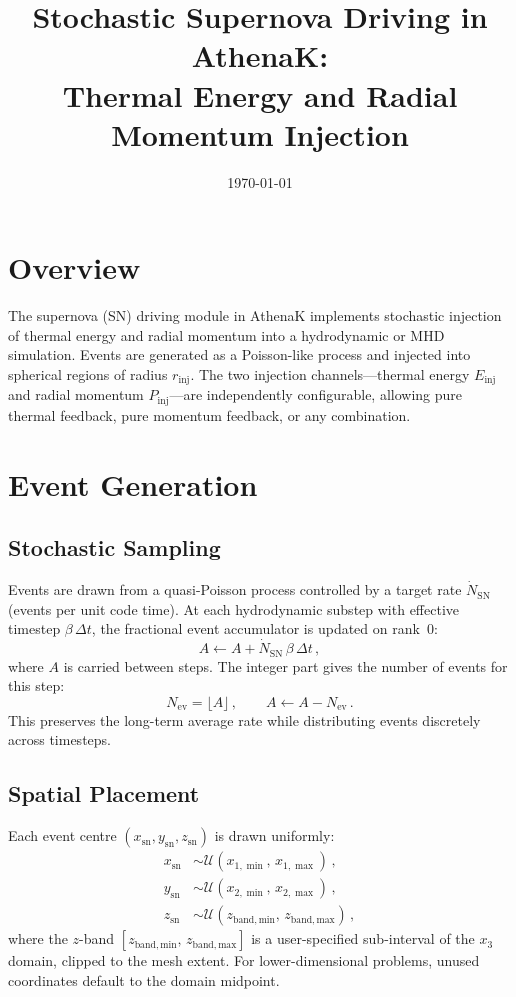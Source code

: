 \documentclass[11pt]{article}
\title{Stochastic Supernova Driving in AthenaK:\\Thermal Energy and Radial Momentum Injection}
\author{}
\date{\today}
\begin{document}
\maketitle

\section{Overview}

The supernova (SN) driving module in AthenaK implements stochastic injection of
thermal energy and radial momentum into a hydrodynamic or MHD simulation.  Events
are generated as a Poisson-like process and injected into spherical regions of
radius $r_\mathrm{inj}$.  The two injection channels---thermal energy
$E_\mathrm{inj}$ and radial momentum $P_\mathrm{inj}$---are independently
configurable, allowing pure thermal feedback, pure momentum feedback, or any
combination.

\section{Event Generation}

\subsection{Stochastic Sampling}

Events are drawn from a quasi-Poisson process controlled by a target rate
$\dot{N}_\mathrm{SN}$ (events per unit code time).  At each hydrodynamic
substep with effective timestep $\beta\,\Delta t$, the fractional event
accumulator is updated on rank~0:
\begin{equation}
  A \leftarrow A + \dot{N}_\mathrm{SN}\,\beta\,\Delta t\,,
\end{equation}
where $A$ is carried between steps.  The integer part gives the number of events
for this step:
\begin{equation}
  N_\mathrm{ev} = \lfloor A \rfloor\,, \qquad A \leftarrow A - N_\mathrm{ev}\,.
\end{equation}
This preserves the long-term average rate while distributing events discretely
across timesteps.

\subsection{Spatial Placement}

Each event centre $(x_\mathrm{sn}, y_\mathrm{sn}, z_\mathrm{sn})$ is drawn
uniformly:
\begin{align}
  x_\mathrm{sn} &\sim \mathcal{U}(x_{1,\min},\, x_{1,\max})\,, \\
  y_\mathrm{sn} &\sim \mathcal{U}(x_{2,\min},\, x_{2,\max})\,, \\
  z_\mathrm{sn} &\sim \mathcal{U}(z_\mathrm{band,min},\, z_\mathrm{band,max})\,,
\end{align}
where the $z$-band $[z_\mathrm{band,min},\, z_\mathrm{band,max}]$ is a
user-specified sub-interval of the $x_3$ domain, clipped to the mesh extent.
For lower-dimensional problems, unused coordinates default to the domain
midpoint.
\end{document}
